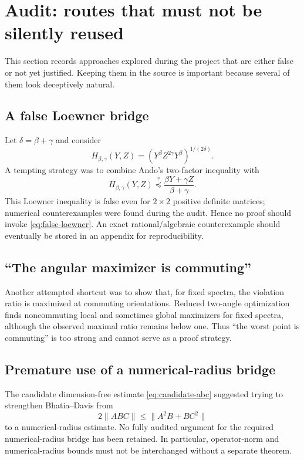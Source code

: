 \section{Audit: routes that must not be silently reused}

This section records approaches explored during the project that are either false or not yet justified.  Keeping them in the source is important because several of them look deceptively natural.

\subsection{A false Loewner bridge}
Let $\delta=\beta+\gamma$ and consider
\[
H_{\beta,\gamma}(Y,Z)
=\left(Y^\beta Z^{2\gamma}Y^\beta\right)^{1/(2\delta)}.
\]
A tempting strategy was to combine Ando's two-factor inequality with
\begin{equation}
H_{\beta,\gamma}(Y,Z)
\stackrel{?}{\preceq}
\frac{\beta Y+\gamma Z}{\beta+\gamma}.
\label{eq:false-loewner}
\end{equation}
\statusF{} This Loewner inequality is false even for $2\times2$ positive definite matrices; numerical counterexamples were found during the audit.  Hence no proof should invoke \eqref{eq:false-loewner}.  An exact rational/algebraic counterexample should eventually be stored in an appendix for reproducibility.

\subsection{``The angular maximizer is commuting''}
Another attempted shortcut was to show that, for fixed spectra, the violation ratio is maximized at commuting orientations.  \statusF{} Reduced two-angle optimization finds noncommuting local and sometimes global maximizers for fixed spectra, although the observed maximal ratio remains below one.  Thus ``the worst point is commuting'' is too strong and cannot serve as a proof strategy.

\subsection{Premature use of a numerical-radius bridge}
The candidate dimension-free estimate \eqref{eq:candidate-abc} suggested trying to strengthen Bhatia--Davis from
\[
2\|ABC\|\le\|A^2B+BC^2\|
\]
to a numerical-radius estimate.  \statusW{} No fully audited argument for the required numerical-radius bridge has been retained.  In particular, operator-norm and numerical-radius bounds must not be interchanged without a separate theorem.

